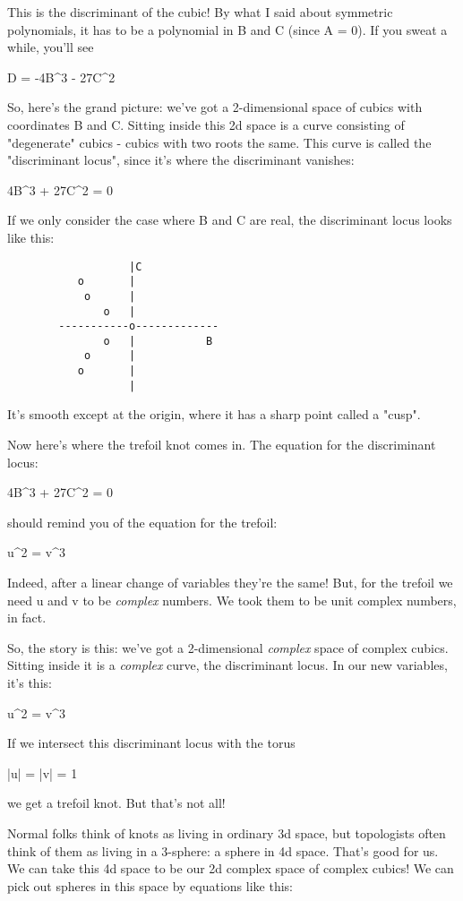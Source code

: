 This is the discriminant of the cubic!  By what I said about symmetric 
polynomials, it has to be a polynomial in B and C (since A = 0).  If 
you sweat a while, you'll see 

D = -4B^{3} - 27C^{2}

So, here's the grand picture: we've got a 2-dimensional space of 
cubics with coordinates B and C.   Sitting inside this 2d space is a 
curve consisting of "degenerate" cubics - cubics with two roots the 
same.  This curve is called the "discriminant locus", since it's where 
the discriminant vanishes:

4B^{3} + 27C^{2} = 0

If we only consider the case where B and C are real, the discriminant 
locus looks like this:

\begin{verbatim}
                   |C
           o       |      
            o      |     
               o   |  
        -----------o-------------
               o   |           B
            o      |     
           o       |
                   |
\end{verbatim}
    
It's smooth except at the origin, where it has a sharp point called
a "cusp".

Now here's where the trefoil knot comes in.  The equation for the 
discriminant locus:

4B^{3} + 27C^{2} = 0

should remind you of the equation for the trefoil:

u^{2} = v^{3} 

Indeed, after a linear change of variables they're the same!   
But, for the trefoil we need u and v to be \emph{complex} numbers.  
We took them to be unit complex numbers, in fact.

So, the story is this: we've got a 2-dimensional \emph{complex} space 
of complex cubics.  Sitting inside it is a \emph{complex} curve, the
discriminant locus.  In our new variables, it's this:

u^{2} = v^{3}

If we intersect this discriminant locus with the torus 

|u| = |v| = 1

we get a trefoil knot.  But that's not all!

Normal folks think of knots as living in ordinary 3d space, but 
topologists often think of them as living in a 3-sphere: a sphere 
in 4d space.  That's good for us.  We can take this 4d space to be
our 2d complex space of complex cubics!  We can pick out spheres in 
this space by equations like this:

